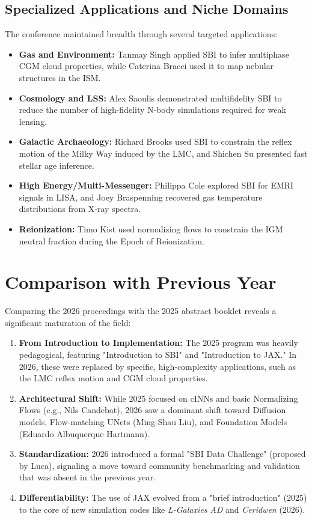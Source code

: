 \documentclass[11pt]{article}
\begin{document}
\subsection{Specialized Applications and Niche Domains}
The conference maintained breadth through several targeted applications:
\begin{itemize}
    \item \textbf{Gas and Environment:} Tanmay Singh applied SBI to infer multiphase CGM cloud properties, while Caterina Bracci used it to map nebular structures in the ISM.
    \item \textbf{Cosmology and LSS:} Alex Saoulis demonstrated multifidelity SBI to reduce the number of high-fidelity N-body simulations required for weak lensing.
    \item \textbf{Galactic Archaeology:} Richard Brooks used SBI to constrain the reflex motion of the Milky Way induced by the LMC, and Shichen Su presented fast stellar age inference.
    \item \textbf{High Energy/Multi-Messenger:} Philippa Cole explored SBI for EMRI signals in LISA, and Joey Braspenning recovered gas temperature distributions from X-ray spectra.
    \item \textbf{Reionization:} Timo Kist used normalizing flows to constrain the IGM neutral fraction during the Epoch of Reionization.
\end{itemize}

\section{Comparison with Previous Year}
Comparing the 2026 proceedings with the 2025 abstract booklet reveals a significant maturation of the field:
\begin{enumerate}
    \item \textbf{From Introduction to Implementation:} The 2025 program was heavily pedagogical, featuring "Introduction to SBI" and "Introduction to JAX." In 2026, these were replaced by specific, high-complexity applications, such as the LMC reflex motion and CGM cloud properties.
    \item \textbf{Architectural Shift:} While 2025 focused on cINNs and basic Normalizing Flows (e.g., Nils Candebat), 2026 saw a dominant shift toward Diffusion models, Flow-matching UNets (Ming-Shau Liu), and Foundation Models (Eduardo Albuquerque Hartmann).
    \item \textbf{Standardization:} 2026 introduced a formal "SBI Data Challenge" (proposed by Luca), signaling a move toward community benchmarking and validation that was absent in the previous year.
    \item \textbf{Differentiability:} The use of JAX evolved from a "brief introduction" (2025) to the core of new simulation codes like \textit{L-Galaxies AD} and \textit{Ceridwen} (2026).
\end{enumerate}
\end{document}
